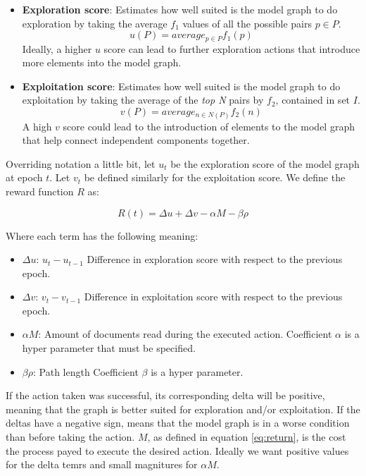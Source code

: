 \documentclass[12pt]{article}
\begin{document}
\begin{itemize}
  \item \textbf{Exploration score}: Estimates how well suited is the model graph to do exploration by taking the average $f_1$ values of all the possible pairs $p \in P$.
\begin{equation}
\label{eq:exploration-score}
  u(P) = average_{p\in P} f_{1}(p)
\end{equation}
Ideally, a higher $u$ score can lead to further exploration actions that introduce more elements into the model graph.
\item \textbf{Exploitation score}: Estimates how well suited is the model graph to do exploitation by taking the average of the \emph{top N} pairs by $f_2$, contained in set $I$.
\begin{equation}
\label{eq:exploitation-score}
  v(P) = average_{n\in N(P)} f_{2}(n)
\end{equation}
A high $v$ score could lead to the introduction of elements to the model graph that help connect independent components together.

\end{itemize}

Overriding notation a little bit, let $u_t$ be the exploration score of the model graph at epoch $t$. Let $v_t$ be defined similarly for the exploitation score. We define the reward function $R$ as:

\begin{equation}
  R(t) = \Delta u + \Delta v - \alpha M - \beta \rho 
\end{equation}

Where each term has the following meaning:

\begin{itemize}
  \item $\Delta u$: $u_t - u_{t-1}$ Difference in exploration score with respect to the previous epoch.
  \item $\Delta v$: $v_t - v_{t-1}$ Difference in exploitation score with respect to the previous epoch.
  \item $\alpha M$: Amount of documents read during the executed action. Coefficient $\alpha$ is a hyper parameter that must be specified.
  \item $\beta \rho$: Path length  Coefficient $\beta$ is a hyper parameter.
\end{itemize}

If the action taken was successful, its corresponding delta will be positive, meaning that the graph is better suited for exploration and/or exploitation. If the deltas have a negative sign, means that the model graph is in a worse condition than before taking the action. $M$, as defined in equation \ref{eq:return}, is the cost the process payed to execute the desired action. Ideally we want positive values for the delta temrs and small magnitures for $\alpha M$.
\end{document}

